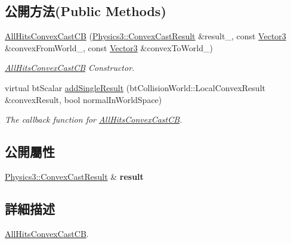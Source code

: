 \subsection*{公開方法(Public Methods)}
\begin{DoxyCompactItemize}
\item 
\hyperlink{struct_magnum_1_1_all_hits_convex_cast_c_b_ac455ab9174e71a1b952a736cabe94e96}{All\+Hits\+Convex\+Cast\+CB} (\hyperlink{class_magnum_1_1_physics3_1_1_convex_cast_result}{Physics3\+::\+Convex\+Cast\+Result} \&result\+\_\+, const \hyperlink{class_magnum_1_1_vector3}{Vector3} \&convex\+From\+World\+\_\+, const \hyperlink{class_magnum_1_1_vector3}{Vector3} \&convex\+To\+World\+\_\+)
\begin{DoxyCompactList}\small\item\em \hyperlink{struct_magnum_1_1_all_hits_convex_cast_c_b}{All\+Hits\+Convex\+Cast\+CB} Constructor. \end{DoxyCompactList}\item 
virtual bt\+Scalar \hyperlink{struct_magnum_1_1_all_hits_convex_cast_c_b_a4f85ba1c8fb0c94fd0adc8492a311596}{add\+Single\+Result} (bt\+Collision\+World\+::\+Local\+Convex\+Result \&convex\+Result, bool normal\+In\+World\+Space)
\begin{DoxyCompactList}\small\item\em The callback function for \hyperlink{struct_magnum_1_1_all_hits_convex_cast_c_b}{All\+Hits\+Convex\+Cast\+CB}. \end{DoxyCompactList}\end{DoxyCompactItemize}
\subsection*{公開屬性}
\begin{DoxyCompactItemize}
\item 
\hyperlink{class_magnum_1_1_physics3_1_1_convex_cast_result}{Physics3\+::\+Convex\+Cast\+Result} \& {\bfseries result}\hypertarget{struct_magnum_1_1_all_hits_convex_cast_c_b_a3bcc3a062bd3322a761891d328c3d101}{}\label{struct_magnum_1_1_all_hits_convex_cast_c_b_a3bcc3a062bd3322a761891d328c3d101}

\end{DoxyCompactItemize}


\subsection{詳細描述}
\hyperlink{struct_magnum_1_1_all_hits_convex_cast_c_b}{All\+Hits\+Convex\+Cast\+CB}. 

